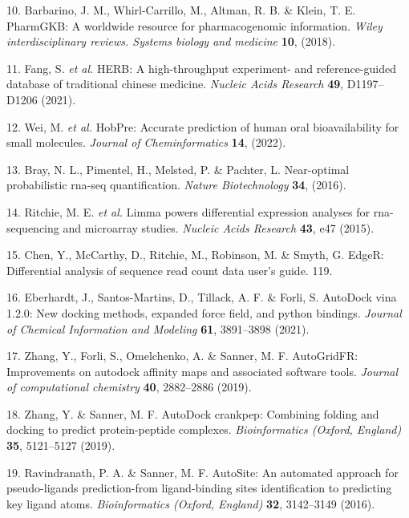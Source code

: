 \documentclass[
]{article}
\newenvironment{cslreferences}%
  {}%
  {\par}
\begin{document}
\begin{cslreferences}
\leavevmode\hypertarget{ref-PharmgkbAWorBarbar2018}{}%
10. Barbarino, J. M., Whirl-Carrillo, M., Altman, R. B. \& Klein, T. E. PharmGKB: A worldwide resource for pharmacogenomic information. \emph{Wiley interdisciplinary reviews. Systems biology and medicine} \textbf{10}, (2018).

\leavevmode\hypertarget{ref-HerbAHighThFang2021}{}%
11. Fang, S. \emph{et al.} HERB: A high-throughput experiment- and reference-guided database of traditional chinese medicine. \emph{Nucleic Acids Research} \textbf{49}, D1197--D1206 (2021).

\leavevmode\hypertarget{ref-HobpreAccuratWeiM2022}{}%
12. Wei, M. \emph{et al.} HobPre: Accurate prediction of human oral bioavailability for small molecules. \emph{Journal of Cheminformatics} \textbf{14}, (2022).

\leavevmode\hypertarget{ref-NearOptimalPrBray2016}{}%
13. Bray, N. L., Pimentel, H., Melsted, P. \& Pachter, L. Near-optimal probabilistic rna-seq quantification. \emph{Nature Biotechnology} \textbf{34}, (2016).

\leavevmode\hypertarget{ref-LimmaPowersDiRitchi2015}{}%
14. Ritchie, M. E. \emph{et al.} Limma powers differential expression analyses for rna-sequencing and microarray studies. \emph{Nucleic Acids Research} \textbf{43}, e47 (2015).

\leavevmode\hypertarget{ref-EdgerDifferenChen}{}%
15. Chen, Y., McCarthy, D., Ritchie, M., Robinson, M. \& Smyth, G. EdgeR: Differential analysis of sequence read count data user's guide. 119.

\leavevmode\hypertarget{ref-AutodockVina1Eberha2021}{}%
16. Eberhardt, J., Santos-Martins, D., Tillack, A. F. \& Forli, S. AutoDock vina 1.2.0: New docking methods, expanded force field, and python bindings. \emph{Journal of Chemical Information and Modeling} \textbf{61}, 3891--3898 (2021).

\leavevmode\hypertarget{ref-AutogridfrImpZhang2019}{}%
17. Zhang, Y., Forli, S., Omelchenko, A. \& Sanner, M. F. AutoGridFR: Improvements on autodock affinity maps and associated software tools. \emph{Journal of computational chemistry} \textbf{40}, 2882--2886 (2019).

\leavevmode\hypertarget{ref-AutodockCrankpZhang2019}{}%
18. Zhang, Y. \& Sanner, M. F. AutoDock crankpep: Combining folding and docking to predict protein-peptide complexes. \emph{Bioinformatics (Oxford, England)} \textbf{35}, 5121--5127 (2019).

\leavevmode\hypertarget{ref-AutositeAnAuRavind2016}{}%
19. Ravindranath, P. A. \& Sanner, M. F. AutoSite: An automated approach for pseudo-ligands prediction-from ligand-binding sites identification to predicting key ligand atoms. \emph{Bioinformatics (Oxford, England)} \textbf{32}, 3142--3149 (2016).


\end{cslreferences}
\end{document}
